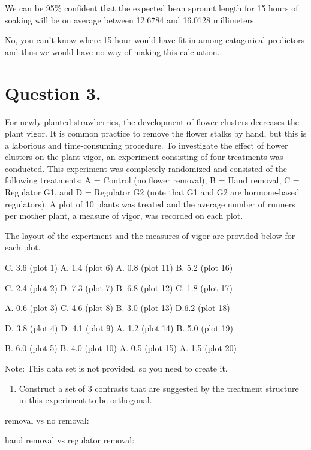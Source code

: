 \documentclass[]{article}
\providecommand{\tightlist}{%
  \setlength{\itemsep}{0pt}\setlength{\parskip}{0pt}}
\begin{document}
We can be 95\% confident that the expected bean sprount length for 15
hours of soaking will be on average between 12.6784 and 16.0128
millimeters.

No, you can't know where 15 hour would have fit in among catagorical
predictors and thus we would have no way of making this calcuation.
\pagebreak

\section{Question 3.}\label{question-3.}

For newly planted strawberries, the development of flower clusters
decreases the plant vigor. It is common practice to remove the flower
stalks by hand, but this is a laborious and time-consuming procedure. To
investigate the effect of flower clusters on the plant vigor, an
experiment consisting of four treatments was conducted. This experiment
was completely randomized and consisted of the following treatments: A =
Control (no flower removal), B = Hand removal, C = Regulator G1, and D =
Regulator G2 (note that G1 and G2 are hormone-based regulators). A plot
of 10 plants was treated and the average number of runners per mother
plant, a measure of vigor, was recorded on each plot.

The layout of the experiment and the measures of vigor are provided
below for each plot.

C. 3.6 (plot 1) A. 1.4 (plot 6) A. 0.8 (plot 11) B. 5.2 (plot 16)

C. 2.4 (plot 2) D. 7.3 (plot 7) B. 6.8 (plot 12) C. 1.8 (plot 17)

A. 0.6 (plot 3) C. 4.6 (plot 8) B. 3.0 (plot 13) D.6.2 (plot 18)

D. 3.8 (plot 4) D. 4.1 (plot 9) A. 1.2 (plot 14) B. 5.0 (plot 19)

B. 6.0 (plot 5) B. 4.0 (plot 10) A. 0.5 (plot 15) A. 1.5 (plot 20)

Note: This data set is not provided, so you need to create it.

\begin{enumerate}
\def\labelenumi{\Alph{enumi})}
\tightlist
\item
  Construct a set of 3 contrasts that are suggested by the treatment
  structure in this experiment to be orthogonal.
\end{enumerate}

removal vs no removal:

hand removal vs regulator removal:
\end{document}
